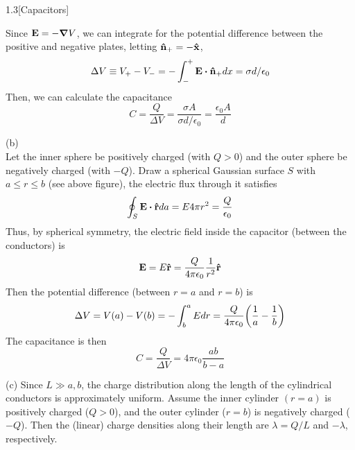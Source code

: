 \documentclass[12pt]{article}
\begin{document}
\begin{problem}{1.3}[Capacitors]
\begin{solution}
    Since $\vb{E}=-\grad V$, we can integrate for the potential difference
    between the positive and negative plates, letting $\vb{\hat{n}}_+=-\vb{\hat{x}}$,
    \begin{equation}
        \Delta V\equiv V_+-V_-=-\int_-^+\vb{E}\vdot\nhat_+dx=\sigma d/\epsilon_0
    \end{equation}
    Then, we can calculate the capacitance
    \begin{equation}
        C=\frac{Q}{\Delta V}=\frac{\sigma A}{\sigma
        d/\epsilon_0}=\frac{\epsilon_0 A}{d} 
    \end{equation}

    (b)\\[3in]Let the inner sphere be positively charged (with $Q>0$) and the
    outer sphere be negatively charged (with $-Q$). Draw a spherical
    Gaussian surface $S$ with $a\leq r\leq b$ (see above figure), the electric 
    flux through it satisfies
    \begin{equation}
        \oint_S\vb{E}\vdot\rhat da=E4\pi r^2=\frac{Q}{\epsilon_0}
    \end{equation}
    Thus, by spherical symmetry, the electric field inside the capacitor
    (between the conductors) is
    \begin{equation}
        \vb{E}=E\vb{\hat{r}}=\frac{Q}{4\pi\epsilon_0}\frac1{r^2}\vb{\hat{r}} 
    \end{equation}
    Then the potential difference (between $r=a$ and $r=b$) is
    \begin{equation}
        \Delta
        V=V(a)-V(b)=-\int_b^aEdr=\frac{Q}{4\pi\epsilon_0}
            \qty(\frac{1}{a}-\frac{1}{b})
    \end{equation}
    The capacitance is then
    \begin{equation}
        C=\frac{Q}{\Delta V}=4\pi\epsilon_0\frac{ab}{b-a} 
    \end{equation}

    (c) Since $L\gg a,b$, the charge distribution along the length of
    the cylindrical conductors is approximately uniform. Assume the inner 
    cylinder $(r=a)$ is positively charged ($Q>0$), and the outer cylinder 
    ($r=b$) is negatively charged ($-Q$). Then the (linear) charge densities 
    along their length are $\lambda=Q/L$ and $-\lambda$,
    respectively.
    \newpage
    ~\\[2in]


\end{solution}
\end{problem}
\end{document}
